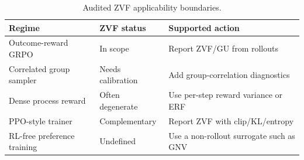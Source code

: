 \begin{table}[h]
\centering
\small
\begin{tabular}{@{}lll@{}}
\toprule
Regime & ZVF status & Supported action \\
\midrule
Outcome-reward GRPO & In scope & Report ZVF/GU from rollouts \\
Correlated group sampler & Needs calibration & Add group-correlation diagnostics \\
Dense process reward & Often degenerate & Use per-step reward variance or ERF \\
PPO-style trainer & Complementary & Report ZVF with clip/KL/entropy \\
RL-free preference training & Undefined & Use a non-rollout surrogate such as GNV \\
\bottomrule
\end{tabular}
\caption{Audited ZVF applicability boundaries.}
\label{tab:ext:zvf-applicability}
\end{table}
